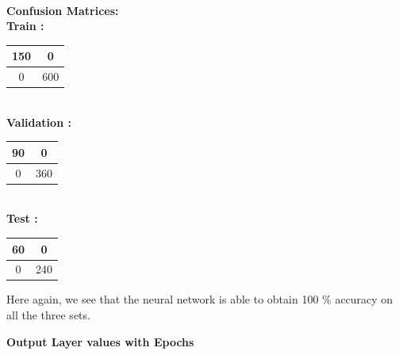 \documentclass{article}
\begin{document}
\begin{flushleft}
\textbf{\\[5pt]Confusion Matrices: \\[10pt]}
\textbf{Train :\\[5pt]}
\begin{tabular}{|c|c|}\hline  150 & 0 \\ \hline 0 & 600 \\ \hline \end{tabular}

\textbf{\\[10pt]Validation :\\[5pt]}

\begin{tabular}{|c|c|}\hline  90 & 0 \\ \hline 0 & 360 \\ \hline \end{tabular}

\textbf{\\[10pt]Test :\\[5pt]}


\begin{tabular}{|c|c|}\hline  60 & 0 \\ \hline 0 & 240 \\ \hline \end{tabular}

Here again, we see that the neural network is able to obtain 100 \% accuracy on all the three sets.
\end{flushleft}
\newpage
\textbf{Output Layer values with Epochs\\[5pt]}
\end{document}
